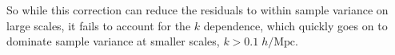                                                                                                                                                                                                                                                                          So while this correction can reduce the residuals 
                                                                                                                                                                                                                                                                         to within sample variance on large scales, it fails to account for 
                                                                                                                                                                                                                                                                         the $k$ dependence, which quickly goes on to dominate sample variance 
                                                                                                                                                                                                                                                                         at smaller scales, $k > 0.1 \;h/\mathrm{Mpc}$.

